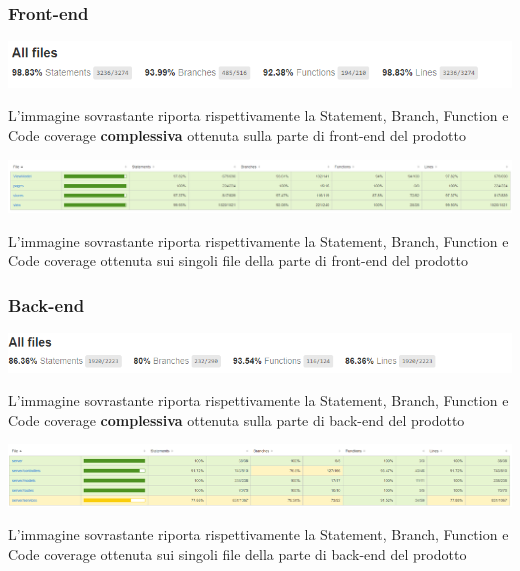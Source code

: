 \documentclass[12pt]{article}
\begin{document}
\subsubsection{Front-end}
\begin{center}
		\begin{center}
			\includegraphics[scale=0.8]{totalCoverageFrontEnd.png}
		\end{center}
		L'immagine sovrastante riporta rispettivamente la Statement, Branch, Function e Code coverage \textbf{complessiva} ottenuta sulla parte di front-end del prodotto
		\begin{center}
			\includegraphics[scale=0.3]{test_frontEnd.png}	
		\end{center}
		L'immagine sovrastante riporta rispettivamente la Statement, Branch, Function e Code coverage ottenuta sui singoli file della parte di front-end del prodotto
\end{center}
\subsubsection{Back-end}
	\begin{center}
		\includegraphics[scale=0.8]{totalCoverageBackEnd.png}
	\end{center}
		L'immagine sovrastante riporta rispettivamente la Statement, Branch, Function e Code coverage \textbf{complessiva} ottenuta sulla parte di back-end del prodotto
	\begin{center}
		\includegraphics[scale=0.3]{test_backEnd.png}
	\end{center}
		L'immagine sovrastante riporta rispettivamente la Statement, Branch, Function e Code coverage ottenuta sui singoli file della parte di back-end del prodotto
	
\end{document}
